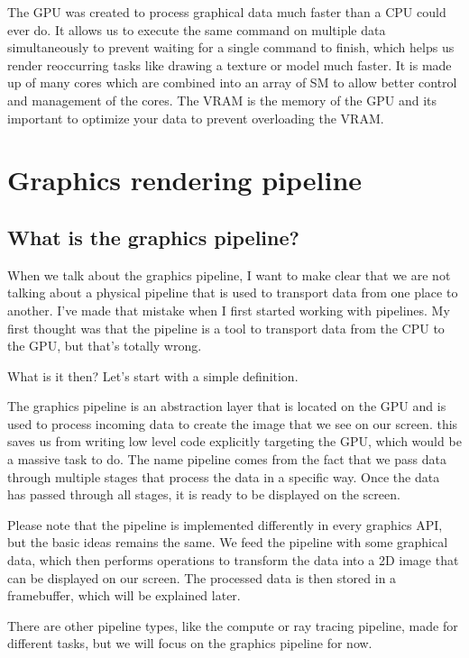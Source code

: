 \documentclass[12pt]{report} \usepackage{preamble}
\begin{document}
The \ac{GPU} was created to process graphical data much faster than a \ac{CPU}
could ever do. It allows us to execute the same command on multiple
data simultaneously to prevent waiting for a single command to finish,
which helps us render reoccurring tasks like drawing a texture or model
much faster.  It is made up of many cores which are combined into an
array of \ac{SM} to allow better control and
management of the cores.  The VRAM is the memory of the \ac{GPU} and its
important to optimize your data to prevent overloading the VRAM.

\chapter{Graphics rendering pipeline}

\section{What is the graphics pipeline?}

When we talk about the graphics pipeline, I want to make clear that we
are not talking about a physical pipeline that is used to transport data
from one place to another. I've made that mistake when I first started
working with pipelines. My first thought was that the pipeline is a tool
to transport data from the \ac{CPU} to the \ac{GPU}, but that's totally wrong.

What is it then? Let's start with a simple definition.

The graphics pipeline is an abstraction layer that is located on the
\ac{GPU} and is used to process incoming data to create the image that we see
on our screen. \cite{vkGuide} this saves us from writing low level code
explicitly targeting the \ac{GPU}, which would be a massive task to do.
The name pipeline comes from the fact that we pass data through
multiple stages that process the data in a specific way. Once the data
has passed through all stages, it is ready to be displayed on the screen.

Please note that the pipeline is implemented differently in every graphics
\ac{API}, but the basic ideas remains the same. We feed the pipeline with some
graphical data, which then performs operations to transform the data into
a 2D image that can be displayed on our screen. The processed data
is then stored in a framebuffer, which will be explained later.
\cite{vkGuide}

There are other pipeline types, like the compute or ray tracing
pipeline, made for different tasks, but we will focus on the graphics
pipeline for now.
\end{document}
